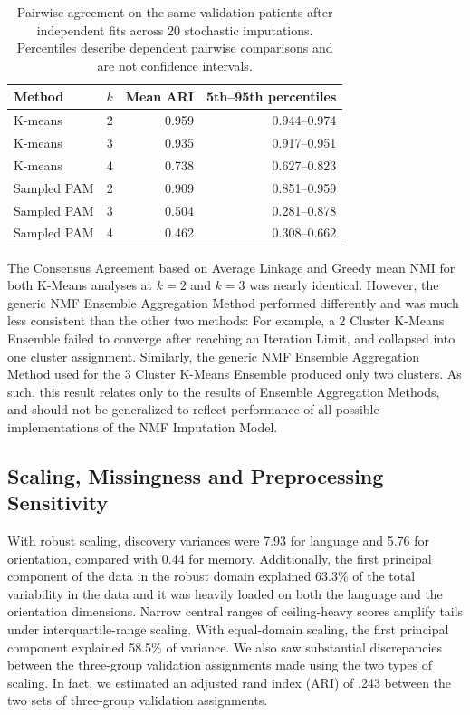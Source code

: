 \begin{table}[htbp]
\centering\small
\caption{Pairwise agreement on the same validation patients after independent fits across 20 stochastic imputations. Percentiles describe dependent pairwise comparisons and are not confidence intervals.}
\label{tab:extension_stability}
\begin{tabular}{lrrr}
\toprule
Method & $k$ & Mean ARI & 5th--95th percentiles \\
\midrule
K-means & 2 & 0.959 & 0.944--0.974 \\
K-means & 3 & 0.935 & 0.917--0.951 \\
K-means & 4 & 0.738 & 0.627--0.823 \\
Sampled PAM & 2 & 0.909 & 0.851--0.959 \\
Sampled PAM & 3 & 0.504 & 0.281--0.878 \\
Sampled PAM & 4 & 0.462 & 0.308--0.662 \\
\bottomrule
\end{tabular}
\end{table}

The Consensus Agreement based on Average Linkage and Greedy mean NMI for both K-Means analyses at $k = 2$ and $k = 3$ was nearly identical. However, the generic NMF Ensemble Aggregation Method performed differently and was much less consistent than the other two methods: For example, a 2 Cluster K-Means Ensemble failed to converge after reaching an Iteration Limit, and collapsed into one cluster assignment. Similarly, the generic NMF Ensemble Aggregation Method used for the 3 Cluster K-Means Ensemble produced only two clusters. As such, this result relates only to the results of Ensemble Aggregation Methods, and should not be generalized to reflect performance of all possible implementations of the NMF Imputation Model.

\subsection{Scaling, Missingness and Preprocessing Sensitivity}

With robust scaling, discovery variances were 7.93 for language and 5.76 for orientation, compared with 0.44 for memory. Additionally, the first principal component of the data in the robust domain explained 63.3\% of the total variability in the data and it was heavily loaded on both the language and the orientation dimensions. Narrow central ranges of ceiling-heavy scores amplify tails under interquartile-range scaling. With equal-domain scaling, the first principal component explained 58.5\% of variance. We also saw substantial discrepancies between the three-group validation assignments made using the two types of scaling. In fact, we estimated an adjusted rand index (ARI) of .243 between the two sets of three-group validation assignments.

